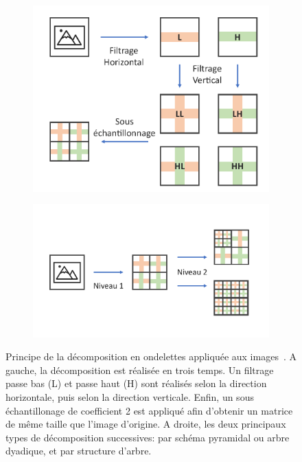 \begin{figure}[H]
\centering
    \begin{subfigure}{.45\textwidth}
      \centering
      \includegraphics[width=\linewidth]{contents/chapter_4/resources/scheme_dwt.pdf}
    \end{subfigure}
    \vrule
    \begin{subfigure}{.45\textwidth}
      \centering
      \includegraphics[width=\linewidth]{contents/chapter_4/resources/scheme_dwt_decomposition.pdf}
    \end{subfigure}
    \caption{Principe de la décomposition en ondelettes appliquée aux images~\cite{Livens1997}. A gauche, la décomposition est réalisée en trois temps. Un filtrage passe bas (L) et passe haut (H) sont réalisés selon la direction horizontale, puis selon la direction verticale. Enfin, un sous échantillonage de coefficient 2 est appliqué afin d'obtenir un matrice de même taille que l'image d'origine. A droite, les  deux principaux types de décomposition successives: par schéma pyramidal ou arbre dyadique, et par structure d'arbre.}
    \label{fig:photography_example}
\end{figure}\par

